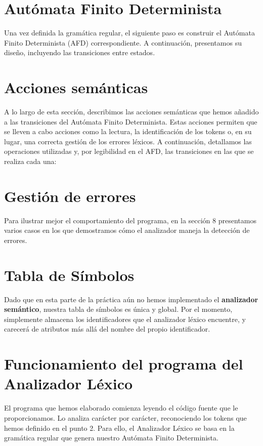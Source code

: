\documentclass{article}
\begin{document}


\section{Autómata Finito Determinista}
Una vez definida la gramática regular, el siguiente paso es construir el Autómata Finito Determinista (AFD) correspondiente. A continuación, presentamos su diseño, incluyendo las transiciones entre estados.



\section{Acciones semánticas}
A lo largo de esta sección, describimos las acciones semánticas que hemos añadido a las transiciones del Autómata Finito Determinista. Estas acciones permiten que se lleven a cabo acciones como la lectura, la identificación de los tokens o, en su lugar, una correcta gestión de los errores léxicos. A continuación, detallamos las operaciones utilizadas y, por legibilidad en el AFD, las transiciones en las que se realiza cada una:\\


\section{Gestión de errores}


Para ilustrar mejor el comportamiento del programa, en la sección 8 presentamos varios casos en los que demostramos cómo el analizador maneja la detección de errores.

\section{Tabla de Símbolos}
Dado que en esta parte de la práctica aún no hemos implementado el \textbf{analizador semántico}, nuestra tabla de símbolos es única y global. Por el momento, simplemente almacena los identificadores que el analizador léxico encuentre, y carecerá de atributos más allá del nombre del propio identificador.

\section{Funcionamiento del programa del Analizador Léxico}
El programa que hemos elaborado comienza leyendo el código fuente que le proporcionamos. Lo analiza carácter por carácter, reconociendo los tokens que hemos definido en el punto 2. Para ello, el Analizador Léxico se basa en la gramática regular que genera nuestro Autómata Finito Determinista.
\end{document}
